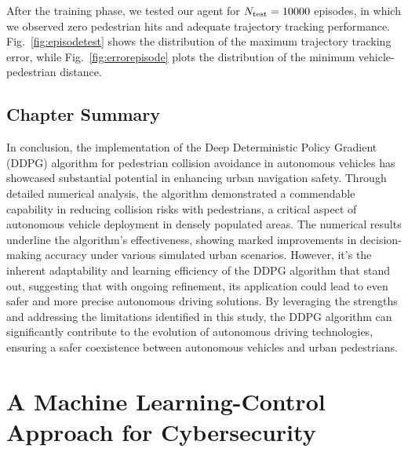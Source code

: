 After the training phase, we tested our agent for $N_{\rm test} = 10000$ episodes, in which we observed zero pedestrian hits and adequate trajectory tracking performance. Fig.~\ref{fig:episodetest} shows the distribution of the maximum trajectory tracking error, while Fig.~\ref{fig:errorepisode} plots the distribution of the minimum vehicle-pedestrian distance.



\newpage
\section{Chapter Summary}


In conclusion, the implementation of the Deep Deterministic Policy Gradient (DDPG) algorithm for pedestrian collision avoidance in autonomous vehicles has showcased substantial potential in enhancing urban navigation safety. Through detailed numerical analysis, the algorithm demonstrated a commendable capability in reducing collision risks with pedestrians, a critical aspect of autonomous vehicle deployment in densely populated areas. The numerical results underline the algorithm's effectiveness, showing marked improvements in decision-making accuracy under various simulated urban scenarios. However, it's the inherent adaptability and learning efficiency of the DDPG algorithm that stand out, suggesting that with ongoing refinement, its application could lead to even safer and more precise autonomous driving solutions. By leveraging the strengths and addressing the limitations identified in this study, the DDPG algorithm can significantly contribute to the evolution of autonomous driving technologies, ensuring a safer coexistence between autonomous vehicles and urban pedestrians.

\chapter{A Machine Learning-Control Approach for Cybersecurity}
\label{Chapter:4}



